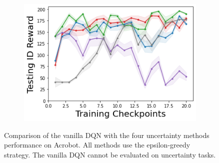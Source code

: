 \begin{figure}
\begin{subfigure}{.3\textwidth}
    \end{subfigure}
    \begin{subfigure}{.3\textwidth}
        \includegraphics[width=\textwidth]{sections/011_icml2022/resources/CartPole-v0-mean_reward_-testing-model+.png}
    \end{subfigure}

        \caption{Comparison of the vanilla DQN with the four uncertainty methods performance on Acrobot. All methods use the epsilon-greedy strategy. The vanilla DQN cannot be evaluated on uncertainty tasks.}
    \label{fig:camprison-vanilla-cartpole}
\end{figure}